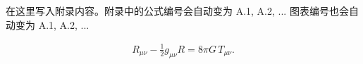\documentclass[../main.tex]{subfiles}
\begin{document}
\cleardoublepage
\chapappendix

 \label{App:NP formalism}

在这里写入附录内容。附录中的公式编号会自动变为 A.1, A.2, ...
图表编号也会自动变为 A.1, A.2, ...

\begin{align}
	R_{\mu\nu} - \frac{1}{2} g_{\mu\nu} R = 8\pi G \, T_{\mu\nu} .
\end{align}

\FloatBarrier
\clearpage
\begingroup
{}
\renewcommand{\bibname}{\heiti \zihao{4} 参考文献}

\endgroup
\end{document}
